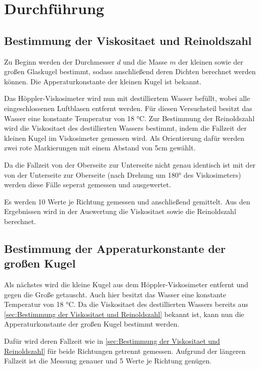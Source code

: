 \section{Durchführung}
\label{sec:Durchführung}

\subsection{Bestimmung der Viskositaet und Reinoldszahl}
\label{sec:Bestimmung der Viskositaet und Reinoldszahl}

Zu Beginn werden der Durchmesser $d$ und die Masse $m$ der kleinen sowie der großen Glaskugel bestimmt,
sodass anschließend deren Dichten berechnet werden können. Die Apperaturkonstante der kleinen Kugel ist bekannt.

Das Höppler-Viskosimeter wird nun mit destilliertem Wasser befüllt, wobei alle eingeschlossenen Luftblasen entfernt werden.
Für diesen Versuchsteil besitzt das Wasser eine konstante Temperatur von 18 °C.
Zur Bestimmung der Reinoldszahl wird die Viskositaet des destillierten Wassers bestimmt, indem
die Fallzeit der kleinen Kugel im Viskosimeter gemessen wird. Als Orientierung dafür werden zwei rote 
Markierungen mit einem Abstand von 5cm gewählt.

Da die Fallzeit von der Oberseite zur Unterseite nicht genau identisch ist mit der von der Unterseite zur Oberseite
(nach Drehung um 180° des Viskosimeters) werden diese Fälle seperat gemessen und ausgewertet.

Es werden 10 Werte je Richtung gemessen und anschließend gemittelt. Aus den Ergebnissen wird in der Auswertung die Viskositaet
sowie die Reinoldszahl berechnet.

\subsection{Bestimmung der Apperaturkonstante der großen Kugel}
\label{sec:Bestimmung der Apperaturkonstante der großen Kugel}
Als nächstes wird die kleine Kugel aus dem Höppler-Viskosimeter entfernt und gegen die Große getauscht.
Auch hier besitzt das Wasser eine konstante Temperatur von 18 °C.
Da die Viskositaet des destillierten Wassers bereits aus \autoref{sec:Bestimmung der Viskositaet und Reinoldszahl} bekannt ist,
kann nun die Apperaturkonstante der großen Kugel bestimmt werden.

Dafür wird deren Fallzeit wie in \autoref{sec:Bestimmung der Viskositaet und Reinoldszahl} für beide Richtungen getrennt gemessen.
Aufgrund der längeren Fallzeit ist die Messung genauer und 5 Werte je Richtung genügen.

